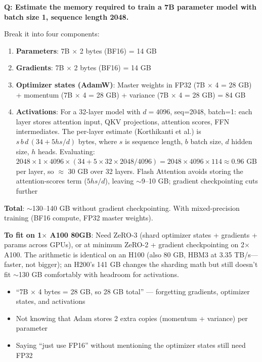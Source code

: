 \begin{interviewq}
\textbf{Q: Estimate the memory required to train a 7B parameter model with batch size 1, sequence length 2048.}

 \quad {} \quad \badgefreq{\freqhigh}

\stronganswer Break it into four components:

\begin{enumerate}
    \item \textbf{Parameters}: 7B $\times$ 2 bytes (BF16) = 14 GB
    \item \textbf{Gradients}: 7B $\times$ 2 bytes (BF16) = 14 GB
    \item \textbf{Optimizer states (AdamW)}: Master weights in FP32 (7B $\times$ 4 = 28 GB) + momentum (7B $\times$ 4 = 28 GB) + variance (7B $\times$ 4 = 28 GB) = 84 GB
    \item \textbf{Activations}: For a 32-layer model with $d=4096$, seq=2048, batch=1: each layer stores attention input, QKV projections, attention scores, FFN intermediates. The per-layer estimate (Korthikanti et al.) is $s\,b\,d\,(34 + 5hs/d)$ bytes, where $s$ is sequence length, $b$ batch size, $d$ hidden size, $h$ heads. Evaluating: $2048 \times 1 \times 4096 \times (34 + 5 \times 32 \times 2048/4096) = 2048 \times 4096 \times 114 \approx 0.96$ GB per layer, so $\approx$ 30 GB over 32 layers. Flash Attention avoids storing the attention-scores term ($5hs/d$), leaving $\sim$9--10 GB; gradient checkpointing cuts further
\end{enumerate}

\textbf{Total}: $\sim$130--140 GB without gradient checkpointing. With mixed-precision training (BF16 compute, FP32 master weights).

\textbf{To fit on 1$\times$ A100 80GB}: Need ZeRO-3 (shard optimizer states + gradients + params across GPUs), or at minimum ZeRO-2 + gradient checkpointing on 2$\times$ A100. The arithmetic is identical on an H100 (also 80 GB, HBM3 at 3.35 TB/s---faster, not bigger); an H200's 141 GB changes the sharding math but still doesn't fit $\sim$130 GB comfortably with headroom for activations.

\redflags
\begin{itemize}
    \item ``7B $\times$ 4 bytes = 28 GB, so 28 GB total'' --- forgetting gradients, optimizer states, and activations
    \item Not knowing that Adam stores 2 extra copies (momentum + variance) per parameter
    \item Saying ``just use FP16'' without mentioning the optimizer states still need FP32
\end{itemize}


\end{interviewq}
